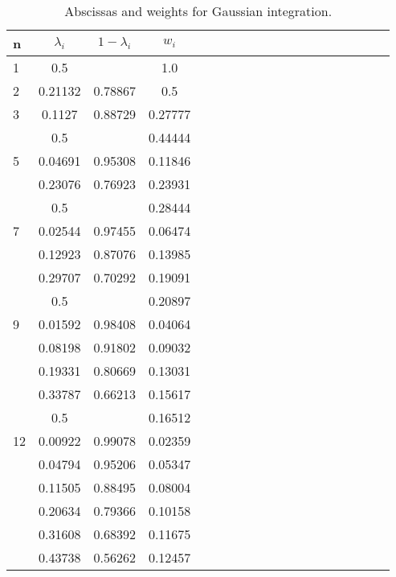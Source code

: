 \clearpage
\begin{table*}
	\caption{\label{tab:Gauss}Abscissas and weights for Gaussian integration.}
	\newcommand{\rb}[1]{\raisebox{1.5ex}[0t]{#1}}
	\begin{tabular}{lcccccccccccccccccc}
		\hline
	   n&$\lambda_{i}$&$1-\lambda_{i}$&$w_{i}$ \\
		\hline
	   1&     0.5&        & 1.0 \\
		\hline
	   2& 0.21132& 0.78867& 0.5 \\
		\hline
	   3&  0.1127& 0.88729& 0.27777 \\
		&     0.5&        & 0.44444 \\
		\hline
	   5& 0.04691& 0.95308& 0.11846 \\
		& 0.23076& 0.76923& 0.23931 \\
		&     0.5&        & 0.28444 \\
		\hline
	   7& 0.02544& 0.97455& 0.06474 \\
		& 0.12923& 0.87076& 0.13985 \\
		& 0.29707& 0.70292& 0.19091 \\
		&     0.5&        & 0.20897 \\
		\hline
	   9& 0.01592& 0.98408& 0.04064 \\
		& 0.08198& 0.91802& 0.09032 \\
		& 0.19331& 0.80669& 0.13031 \\
		& 0.33787& 0.66213& 0.15617 \\
		&     0.5&        & 0.16512 \\
		\hline
	  12& 0.00922& 0.99078& 0.02359 \\ 
		& 0.04794& 0.95206& 0.05347 \\
		& 0.11505& 0.88495& 0.08004 \\
		& 0.20634& 0.79366& 0.10158 \\
		& 0.31608& 0.68392& 0.11675 \\
		& 0.43738& 0.56262& 0.12457 \\
		\hline
	\end{tabular} 
\end{table*}